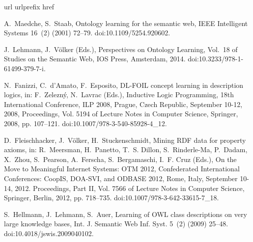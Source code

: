 \documentclass[review]{elsarticle}
\theoremstyle{definition}
\begin{document}

% 
\begin{thebibliography}{10}
\expandafter\ifx\csname url\endcsname\relax
  \def\url#1{\texttt{#1}}\fi
\expandafter\ifx\csname urlprefix\endcsname\relax\def\urlprefix{URL }\fi
\expandafter\ifx\csname href\endcsname\relax
  \def\href#1#2{#2} \def\path#1{#1}\fi

A.~Maedche, S.~Staab, Ontology learning for the semantic web, {IEEE}
  Intelligent Systems 16~(2) (2001) 72--79.
\newblock \href {http://dx.doi.org/10.1109/5254.920602}
  {\path{doi:10.1109/5254.920602}}.

J.~Lehmann, J.~V\"olker (Eds.), Perspectives on Ontology Learning, Vol.~18 of
  Studies on the Semantic Web, IOS Press, Amsterdam, 2014.
\newblock \href {http://dx.doi.org/10.3233/978-1-61499-379-7-i}
  {\path{doi:10.3233/978-1-61499-379-7-i}}.

N.~Fanizzi, C.~d'Amato, F.~Esposito, {DL-FOIL} concept learning in description
  logics, in: F.~Zelezn{\'y}, N.~Lavrac (Eds.), Inductive Logic Programming,
  18th International Conference, ILP 2008, Prague, Czech Republic, September
  10-12, 2008, Proceedings, Vol. 5194 of Lecture Notes in Computer Science,
  Springer, 2008, pp. 107--121.
\newblock \href {http://dx.doi.org/10.1007/978-3-540-85928-4_12}
  {\path{doi:10.1007/978-3-540-85928-4_12}}.

D.~Fleischhacker, J.~V{\"o}lker, H.~Stuckenschmidt, Mining {RDF} data for
  property axioms, in: R.~Meersman, H.~Panetto, T.~S. Dillon, S.~Rinderle-Ma,
  P.~Dadam, X.~Zhou, S.~Pearson, A.~Ferscha, S.~Bergamaschi, I.~F. Cruz (Eds.),
  On the Move to Meaningful Internet Systems: OTM 2012, Confederated
  International Conferences: CoopIS, DOA-SVI, and ODBASE 2012, Rome, Italy,
  September 10-14, 2012. Proceedings, Part II, Vol. 7566 of Lecture Notes in
  Computer Science, Springer, Berlin, 2012, pp. 718--735.
\newblock \href {http://dx.doi.org/10.1007/978-3-642-33615-7_18}
  {\path{doi:10.1007/978-3-642-33615-7_18}}.

S.~Hellmann, J.~Lehmann, S.~Auer, Learning of {OWL} class descriptions on very
  large knowledge bases, Int. J. Semantic Web Inf. Syst. 5~(2) (2009) 25--48.
\newblock \href {http://dx.doi.org/10.4018/jswis.2009040102}
  {\path{doi:10.4018/jswis.2009040102}}.


\end{thebibliography}
\end{document}
